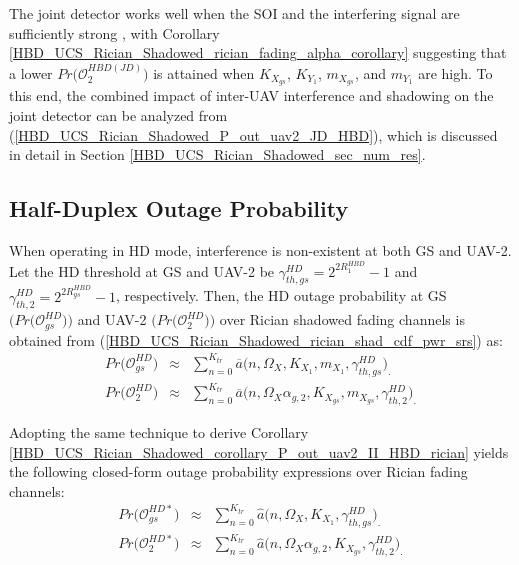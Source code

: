 The joint detector works well when the SOI and the interfering signal are sufficiently strong \cite{zahavi2017cooperation}, with Corollary \ref{HBD_UCS_Rician_Shadowed_rician_fading_alpha_corollary} suggesting that a lower $Pr\big(\mathcal{O}_{2}^{HBD(JD)}\big)$ is attained when $K_{X_{gs}}$, $K_{Y_1}$, $m_{X_{gs}}$, and $m_{Y_1}$ are high. To this end, the combined impact of inter-UAV interference and shadowing on the joint detector can be analyzed from (\ref{HBD_UCS_Rician_Shadowed_P_out_uav2_JD_HBD}), which is discussed in detail in Section \ref{HBD_UCS_Rician_Shadowed_sec_num_res}.

\subsection{Half-Duplex Outage Probability}
When operating in HD mode, interference is non-existent at both GS and UAV-2. Let the HD threshold at GS and UAV-2 be $\gamma_{th,gs}^{HD} = 2^{2R_{1}^{HBD}}-1$ and $\gamma_{th,2}^{HD} = 2^{2R_{gs}^{HBD}}-1$, respectively. Then, the HD outage probability at GS $\big(Pr\big(\mathcal{O}_{gs}^{HD}\big)\big)$ and UAV-2 $\big(Pr\big(\mathcal{O}_{2}^{HD}\big)\big)$ over Rician shadowed fading channels is obtained from (\ref{HBD_UCS_Rician_Shadowed_rician_shad_cdf_pwr_srs}) as:
\begin{eqnarray} 
Pr\big(\mathcal{O}_{gs}^{HD}\big) & \approx & \sum_{n=0}^{K_{tr}} \overline{a}\big(n,\Omega_X,K_{X_1},m_{X_1},\gamma_{th,gs}^{HD}\big)_. \label{HBD_UCS_Rician_Shadowed_P_out_gs_HD} \\
Pr\big(\mathcal{O}_{2}^{HD}\big) & \approx & \sum_{n=0}^{K_{tr}} \overline{a}\big(n,\Omega_X\alpha_{g,2},K_{X_{gs}},m_{X_{gs}},\gamma_{th,2}^{HD}\big)_. \label{HBD_UCS_Rician_Shadowed_P_out_uav2_HD}
\end{eqnarray}

Adopting the same technique to derive Corollary \ref{HBD_UCS_Rician_Shadowed_corollary_P_out_uav2_II_HBD_rician} yields the following closed-form outage probability expressions over Rician fading channels:
\begin{eqnarray} 
Pr\big(\mathcal{O}_{gs}^{HD*}\big) & \approx & \sum_{n=0}^{K_{tr}} \widehat{a}\big(n,\Omega_X,K_{X_1},\gamma_{th,gs}^{HD}\big)_. \label{HBD_UCS_Rician_Shadowed_P_out_gs_HD_Rician} \\
Pr\big(\mathcal{O}_{2}^{HD*}\big) & \approx & \sum_{n=0}^{K_{tr}} \widehat{a}\big(n,\Omega_X\alpha_{g,2},K_{X_{gs}},\gamma_{th,2}^{HD}\big)_. \label{HBD_UCS_Rician_Shadowed_P_out_uav2_HD_Rician}
\end{eqnarray}

